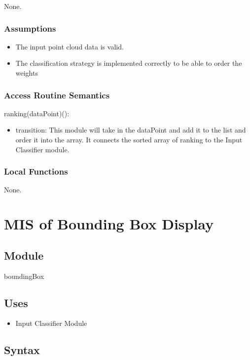 \documentclass[12pt, titlepage]{article}
\begin{document}
None.

\subsubsection{Assumptions}

\begin{itemize}
  \item The input point cloud data is valid.
  \item The classification strategy is implemented correctly to be able to order the weights
\end{itemize}

\subsubsection{Access Routine Semantics}

\noindent ranking(dataPoint)():
\begin{itemize}
  \item transition: This module will take in the dataPoint and add it to the list and order it into the array. It connects the sorted array of ranking to the Input Classifier module.
\end{itemize}

\subsubsection{Local Functions}

None.
\newpage


\section{MIS of Bounding Box Display} \label{ModuleBBD} 

\subsection{Module}

boundingBox

\subsection{Uses}

\begin{itemize}
  \item Input Classifier Module
\end{itemize}

\subsection{Syntax}
\end{document}
